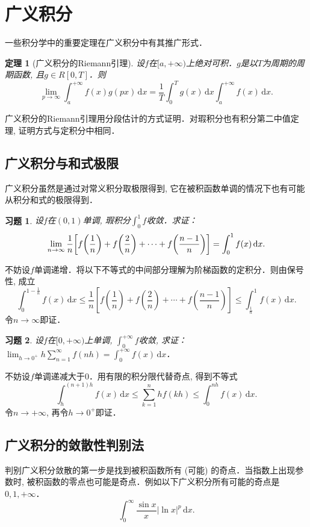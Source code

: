 \documentclass[11pt,a4paper]{ctexart}
\makeatletter
\theoremstyle{thmseries} %
\newtheorem{thm}{定理}[section]
\theoremstyle{exerseries}
\newtheorem{exer}{习题}[section]
\renewenvironment{proof}[1][\proofname]{\par
  \pushQED{\qed}%
  \normalfont \topsep6\p@\@plus6\p@\relax
  \trivlist
  \item[\hskip\labelsep
        \itshape
    #1\@addpunct{}]\ignorespaces
}{%
  \popQED\endtrivlist\@endpefalse
}
\newenvironment{pf}{\begin{proof}[\bfseries\upshape 证\quad]}{\end{proof}}
\newcommand{\bra}[1]{\mathopen{}\left(#1\right)}
\newcommand{\sbra}[1]{\mathopen{}\left[#1\right]}
\renewcommand{\d}{\mathrm{d}}
\def \nti {\mathnormal{n}\to\infty}
\makeatother
\begin{document}
\section{广义积分}
一些积分学中的重要定理在广义积分中有其推广形式．
\begin{thm}[广义积分的Riemann引理]
	设$f$在$[a,+\infty)$上绝对可积．$g$是以$T$为周期的周期函数, 且$g\in R[0,T]$．则
	\[\lim_{p\to\infty}\int_{a}^{+\infty}f(x)g(px)\,\d x=\frac{1}{T}\int_{0}^{T}g(x)\,\d x\int_{a}^{+\infty}f(x)\,\d x.\]
\end{thm}

广义积分的Riemann引理用分段估计的方式证明．对瑕积分也有积分第二中值定理, 证明方式与定积分中相同．


\subsection{广义积分与和式极限}
广义积分虽然是通过对常义积分取极限得到, 它在被积函数单调的情况下也有可能从积分和式的极限得到．
\begin{exer}
	设$f$在$(0,1)$单调, 瑕积分$\int_{0}^{1}f$收敛．求证：
	\[\lim_{\nti}\frac{1}{n}\sbra{f\bra{\frac{1}{n}}+f\bra{\frac{2}{n}}+\cdots+f\bra{\frac{n-1}{n}}}=\int_{0}^{1}f(x)\,\d x.\]
\end{exer}
\begin{pf}
	不妨设$f$单调递增．将以下不等式的中间部分理解为阶梯函数的定积分．则由保号性, 成立
	\[\int_{0}^{1-\frac{1}{n}}f(x)\,\d x\leq\frac{1}{n}\sbra{f\bra{\frac{1}{n}}+f\bra{\frac{2}{n}}+\cdots+f\bra{\frac{n-1}{n}}}\leq\int_{\frac{1}{n}}^{1}f(x)\,\d x.\]
	令$n\to\infty$即证．
\end{pf}

\begin{exer}
	设$f$在$[0,+\infty)$上单调, $\int_{0}^{+\infty}f$收敛, 求证：$\lim_{h\to0^+}h\sum_{n=1}^{\infty}f(nh)=\int_{0}^{+\infty}f(x)\,\d x$．
\end{exer}
\begin{pf}
	不妨设$f$单调递减大于$0$．用有限的积分限代替奇点, 得到不等式
	\[\int_{h}^{(n+1)h}f(x)\,\d x\leq\sum_{k=1}^{n}hf(kh)\leq\int_{0}^{nh}f(x)\,\d x.\]
	令$n\to+\infty$, 再令$h\to0^+$即证．
\end{pf}


\subsection{广义积分的敛散性判别法}
判别广义积分敛散的第一步是找到被积函数所有 (可能) 的奇点．当指数上出现参数时, 被积函数的零点也可能是奇点．例如以下广义积分所有可能的奇点是$0,1,+\infty$．
\[\int_{0}^{\infty}\frac{\sin x}{x}|\ln x|^p\,\d x.\]
\end{document}

